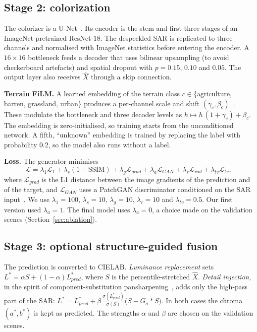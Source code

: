\documentclass[conference]{IEEEtran}
\begin{document}
\subsection{Stage 2: colorization}
The colorizer is a U-Net~\cite{ronneberger2015unet}. Its encoder is the stem and first three stages of an ImageNet-pretrained
ResNet-18. The despeckled SAR is replicated to three channels and normalised with ImageNet statistics before entering the
encoder. A $16{\times}16$ bottleneck feeds a decoder that uses bilinear upsampling (to avoid checkerboard artefacts) and spatial
dropout with $p=0.15$, $0.10$ and $0.05$. The output layer also receives $\hat X$ through a skip connection.

\textbf{Terrain FiLM.} A learned embedding of the terrain class $c\in\{$agriculture, barren, grassland, urban$\}$ produces a
per-channel scale and shift $(\gamma_c,\beta_c)$~\cite{perez2018film}. These modulate the bottleneck and three decoder levels as
$h\mapsto h\,(1+\gamma_c)+\beta_c$. The embedding is zero-initialised, so training starts from the unconditioned network. A
fifth, ``unknown'' embedding is trained by replacing the label with probability 0.2, so the model also runs without a label.

\textbf{Loss.} The generator minimises
\begin{equation}
\mathcal{L} = \lambda_1\mathcal{L}_1 + \lambda_s(1-\mathrm{SSIM}) + \lambda_g\mathcal{L}_{grad} + \lambda_a\mathcal{L}_{GAN}
+ \lambda_r\mathcal{L}_{rad} + \lambda_{tv}\mathcal{L}_{tv},
\end{equation}
where $\mathcal{L}_{grad}$ is the L1 distance between the image gradients of the prediction and of the target, and
$\mathcal{L}_{GAN}$ uses a PatchGAN discriminator conditioned on the SAR input~\cite{isola2017pix2pix}. We use
$\lambda_1{=}100$, $\lambda_s{=}10$, $\lambda_g{=}10$, $\lambda_r{=}10$ and $\lambda_{tv}{=}0.5$. Our first version used
$\lambda_a{=}1$. The final model uses $\lambda_a{=}0$, a choice made on the validation scenes (Section~\ref{sec:ablation}).

\subsection{Stage 3: optional structure-guided fusion}
The prediction is converted to CIELAB. \emph{Luminance replacement} sets $L^* = \alpha S + (1-\alpha)L^*_{pred}$, where $S$ is
the percentile-stretched $\hat X$. \emph{Detail injection}, in the spirit of component-substitution
pansharpening~\cite{vivone2015pansharp}, adds only the high-pass part of the SAR:
$L^* = L^*_{pred} + \beta\,\frac{\sigma(L^*_{pred})}{\sigma(S)}\big(S - G_{\sigma} * S\big)$. In both cases the chroma $(a^*,b^*)$
is kept as predicted. The strengths $\alpha$ and $\beta$ are chosen on the validation scenes.
\end{document}
